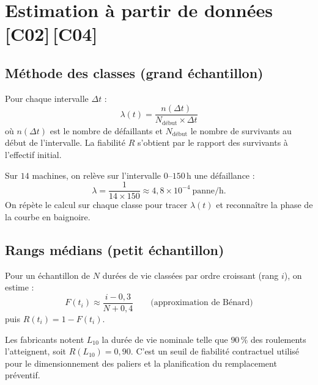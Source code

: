 \documentclass[a4paper,11pt]{article}
\begin{document}
\section{Estimation à partir de données \hfill {\normalsize\color{uimmred}[C02]\,[C04]}}

\subsection{Méthode des classes (grand échantillon)}

\begin{methode}
Pour chaque intervalle $\Delta t$ :
\[
\lambda(t) = \frac{n(\Delta t)}{N_{\text{début}} \times \Delta t}
\]
où $n(\Delta t)$ est le nombre de défaillants et $N_{\text{début}}$ le nombre de survivants au début de l'intervalle. La fiabilité $R$ s'obtient par le rapport des survivants à l'effectif initial.
\end{methode}

\begin{exemple}
Sur $14$ machines, on relève sur l'intervalle $0$--$150$\,h une défaillance :
\[
\lambda = \frac{1}{14 \times 150} \approx 4{,}8 \times 10^{-4}\ \text{panne/h.}
\]
On répète le calcul sur chaque classe pour tracer $\lambda(t)$ et reconnaître la phase de la courbe en baignoire.
\end{exemple}

\subsection{Rangs médians (petit échantillon)}

\begin{methode}
Pour un échantillon de $N$ durées de vie classées par ordre croissant (rang $i$), on estime :
\[
F(t_i) \approx \frac{i - 0{,}3}{N + 0{,}4} \qquad \text{(approximation de Bénard)}
\]
puis $R(t_i) = 1 - F(t_i)$.
\end{methode}

\begin{appliindus}
Les fabricants notent $L_{10}$ la durée de vie nominale telle que $90\,\%$ des roulements l'atteignent, soit $R(L_{10}) = 0{,}90$. C'est un seuil de fiabilité contractuel utilisé pour le dimensionnement des paliers et la planification du remplacement préventif.
\end{appliindus}

\newpage
\end{document}
